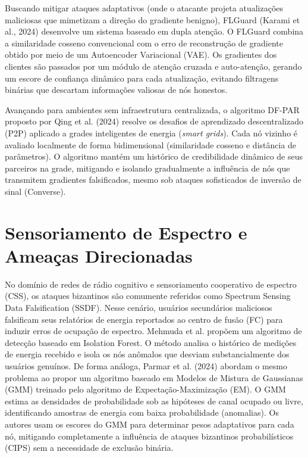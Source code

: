 \documentclass[11pt,a4paper]{article}
\begin{document}
Buscando mitigar ataques adaptativos (onde o atacante projeta atualizações maliciosas que mimetizam a direção do gradiente benigno), FLGuard (Karami et al., 2024) desenvolve um sistema baseado em dupla atenção. O FLGuard combina a similaridade cosseno convencional com o erro de reconstrução de gradiente obtido por meio de um Autoencoder Variacional (VAE). Os gradientes dos clientes são passados por um módulo de atenção cruzada e auto-atenção, gerando um escore de confiança dinâmico para cada atualização, evitando filtragens binárias que descartam informações valiosas de nós honestos.

Avançando para ambientes sem infraestrutura centralizada, o algoritmo DF-PAR proposto por Qing et al. (2024) resolve os desafios de aprendizado descentralizado (P2P) aplicado a grades inteligentes de energia (\emph{smart grids}). Cada nó vizinho é avaliado localmente de forma bidimensional (similaridade cosseno e distância de parâmetros). O algoritmo mantém um histórico de credibilidade dinâmico de seus parceiros na grade, mitigando e isolando gradualmente a influência de nós que transmitem gradientes falsificados, mesmo sob ataques sofisticados de inversão de sinal (Converse).

\section{Sensoriamento de Espectro e Ameaças Direcionadas}
No domínio de redes de rádio cognitivo e sensoriamento cooperativo de espectro (CSS), os ataques bizantinos são comumente referidos como Spectrum Sensing Data Falsification (SSDF). Nesse cenário, usuários secundários maliciosos falsificam seus relatórios de energia reportados ao centro de fusão (FC) para induzir erros de ocupação de espectro. Mehmuda et al. propõem um algoritmo de detecção baseado em Isolation Forest. O método analisa o histórico de medições de energia recebido e isola os nós anômalos que desviam substancialmente dos usuários genuínos. De forma análoga, Parmar et al. (2024) abordam o mesmo problema ao propor um algoritmo baseado em Modelos de Mistura de Gaussianas (GMM) treinado pelo algoritmo de Expectação-Maximização (EM). O GMM estima as densidades de probabilidade sob as hipóteses de canal ocupado ou livre, identificando amostras de energia com baixa probabilidade (anomalias). Os autores usam os escores do GMM para determinar pesos adaptativos para cada nó, mitigando completamente a influência de ataques bizantinos probabilísticos (CIPS) sem a necessidade de exclusão binária.
\end{document}
